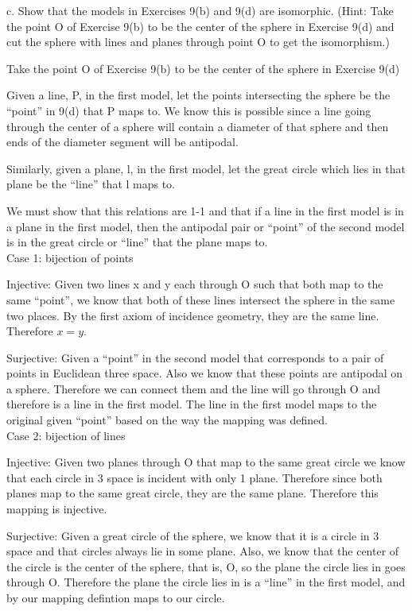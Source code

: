 \documentclass[12pt,letterpaper]{article}
\newcommand{\Proof}{\noindent {\bf Proof: }}
\begin{document}
\newpage 

c. Show that the models in Exercises 9(b) and 9(d) are isomorphic.  (Hint:  Take the point O of Exercise 9(b) to be the center of the sphere in Exercise 9(d) and cut the sphere with lines and planes through point O to get the isomorphism.)\\


\Proof

Take the point O of Exercise 9(b) to be the center of the sphere in Exercise 9(d)

Given a line, P, in the first model, let the points intersecting the sphere be the ``point'' in 9(d) that P maps to.  We know this is possible since a line going through the center of a sphere will contain a diameter of that sphere and then ends of the diameter segment will be antipodal.  

Similarly, given a plane, l, in the first model, let the great circle which lies in that plane be the ``line'' that l maps to.  

We must show that this relations are 1-1 and that if a line in the first model is in a plane in the first model, then the antipodal pair or ``point'' of the second model is in the great circle or ``line'' that the plane maps to.\\

\noindent Case 1: bijection of points

Injective: Given two lines x and y each through O such that both map to the same ``point'', we know that both of these lines intersect the sphere in the same two places.  By the first axiom of incidence geometry, they are the same line.  Therefore $x = y$.

Surjective: Given a ``point'' in the second model that corresponds to a pair of points in Euclidean three space.  Also we know that these points are antipodal on a sphere.  Therefore we can connect them and the line will go through O and therefore is a line in the first model.  The line in the first model maps to the original given ``point'' based on the way the mapping was defined.\\


\noindent Case 2: bijection of lines

Injective:  Given two planes through O that map to the same great circle we know that each circle in 3 space is incident with only 1 plane.  Therefore since both planes map to the same great circle, they are the same plane.  Therefore this mapping is injective.

Surjective:  Given a great circle of the sphere, we know that it is a circle in 3 space and that circles always lie in some plane.  Also, we know that the center of the circle is the center of the sphere, that is, O, so the plane the circle lies in goes through O.  Therefore the plane the circle lies in is a ``line'' in the first model, and by our mapping defintion maps to our circle.\\
\end{document}
